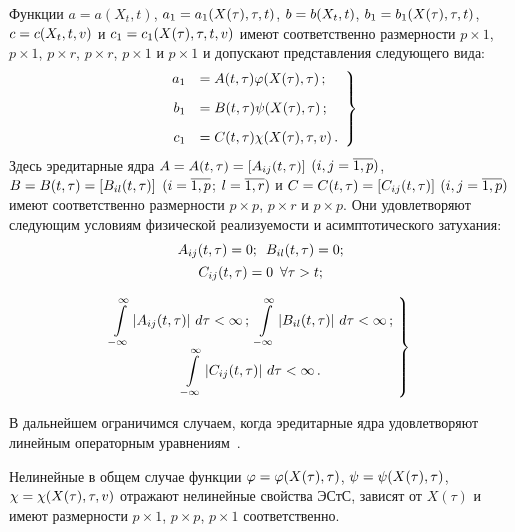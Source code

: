 \begin{multicols}{2}
Функции $a=a(X_t, t)$, $a_1\hm = a_1(X (\tau),\tau, t)$,
$b\hm=b(X_t, t)$, $b_1\hm = b_1(X (\tau),\tau, t)$,
$c\hm=c(X_t,t,v)$ и $c_1\hm = c_1(X (\tau),\tau, t,v)$ имеют
соответственно размерности $p\times 1$, $p\times 1$, $p\times r$,
$p\times r$, $p\times 1$ и $p\times 1$ и допускают представления следующего вида:
\begin{equation}
\left.
\begin{array}{rl}
a_1&=A(t,\tau) \varphi (X(\tau) , \tau)\,;\\[9pt]
b_1&=B(t,\tau) \psi (X(\tau) ,  \tau)\,;\\[9pt]
c_1&=C(t,\tau) \chi (X(\tau) ,  \tau, v)\,.
\end{array}
\right\}
\label{e3.2-sin}
\end{equation}
Здесь эредитарные ядра $A\hm=A(t,\tau)\hm=\lk A_{ij}(t,\tau)\rk$
$(i,j\hm=\overline{1,p})$,
$B\hm=B(t,\tau)=\lk B_{i l}(t,\tau)\rk$ $(i\hm=\overline{1,p}$;
$l\hm=\overline{1,r})$ и $C\hm=C(t,\tau)=\lk C_{ij}(t,\tau)\rk$
$(i,j\hm=\overline{1,p})$ имеют соответственно размерности
$p\times p$, $p\times r$ и $p\times p$. Они удовлетворяют следующим условиям
физической реализуемости и асимптотического затухания:
\begin{multline}
A_{ij}(t,\tau)=0;\enskip B_{i l}(t,\tau)=0;\\[1pt]
C_{ij}(t,\tau)=0\enskip \forall \tau >t;\label{e3.3-sin}
\end{multline}

\vspace*{-12pt}

\begin{equation}
\left.
\hspace*{-3mm}\begin{array}{c}
\displaystyle\iin\! \lv A_{ij} (t,\tau) \rv d\tau <\infty\,;\
\displaystyle\iin\! \lv B_{i l} (t,\tau) \rv d\tau <\infty \,;\\[9pt]
\displaystyle\iin \!\lv C_{ij} (t,\tau) \rv d\tau <\infty\,.
\end{array}\!
\right\}\!
\label{e3.4-sin}
\end{equation}

В дальнейшем ограничимся случаем, когда эредитарные ядра удовлетворяют
линейным операторным уравнениям~\cite{6-sin, 5-sin, 7-sin}.

Нелинейные в общем случае функции $\vrp\hm=\vrp(X(\tau),\tau)$,
$\psi \hm=\psi(X(\tau), \tau)$, $\chi \hm=\chi (X(\tau),  \tau, v)$
отражают нелинейные свойства ЭСтС, зависят от  $X(\tau)$ и имеют размерности
$p\times 1$, $p\times p$, $p\times 1$ соответственно.


\end{multicols}
